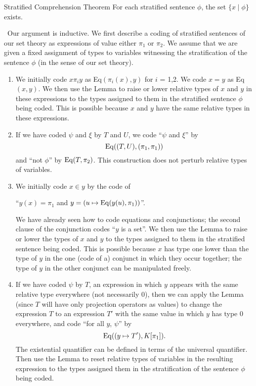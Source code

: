\begin{Thm}{Stratified Comprehension Theorem}
 For each stratified sentence
 $\phi$, the set $\{x\mid\phi\}$ exists.
\end{Thm}

\preuve\ Our argument is inductive.  We first describe a coding
of stratified sentences of our set theory as expressions of value either
$\pi_1$ or $\pi_2$.  We assume that we are given a fixed assignment of
types to variables witnessing the
stratification of the sentence 
$\phi$ (in the sense of our set theory).

\begin{enumerate}
 \item We initially code $x \mathrel{\pi_i} y$ as Eq$(\pi_i(x),y)$ for $i$ =
   1,2.
   We code $x = y$ as Eq$(x,y)$.  We then use the Lemma to raise or lower
   relative types of $x$ and $y$ in these expressions to the types assigned to
   them in the stratified sentence $\phi$ being coded.
   This is possible because $x$ and $y$ have the same relative
   types in these expressions.
 \item If we have coded $\psi$ and $\xi$ by $T$ and $U$, we code
   ``$\psi$ and $\xi$'' by 
   $$
    \mathop{\mathrm{Eq}}((T,U),(\pi_1,\pi_1))
   $$
   and ``not $\phi$''
   by $\mathop{\mathrm{Eq}}(T,\pi_2)$.  This construction does not perturb relative types
   of variables.
 \item We initially code $x \in y$ by the code of
   \begin{center}
    ``$y(x)=\pi_1$ and $y = (u \mapsto \mathop{\mathrm{Eq}}(y(u),\pi_1))$''.
   \end{center}
   We have already seen how to code
   equations and conjunctions; the second clause of the conjunction codes
   ``$y$ is a set''.  We then use the Lemma to raise or lower the
   types 
   of $x$ and $y$ to the types assigned to them in the
   stratified 
   sentence being coded.  This is possible because $x$ has type one lower
   than the type of $y$ in the one (code of a) conjunct in which they
   occur together; the type of $y$ in the other conjunct can be
   manipulated freely.
 \item If we have coded $\psi$ by $T$, an expression in which $y$ appears with
   the same relative type everywhere (not necessarily
   0), then we can 
   apply the Lemma (since $T$ will have only projection operators as
   values) to change the expression $T$ to an expression $T'$ with the same
   value in which $y$ has type 0 everywhere, and code ``for all $y$, $\psi$''
   by
   $$
     \mathop{\mathrm{Eq}}((y \mapsto T'),K[\pi_1]).
   $$
   The existential quantifier can be
   defined in terms of the universal quantifier.  Then use the Lemma to
   reset relative types of variables in the resulting expression to the types
   assigned them in the stratification of the sentence
   $\phi$ being coded.
\end{enumerate}

